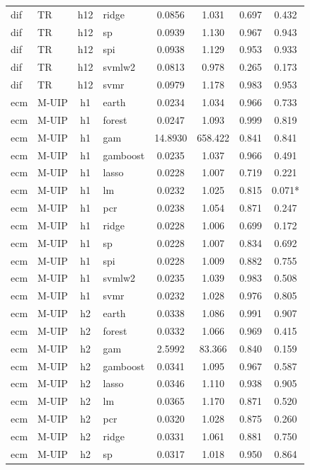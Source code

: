 \begin{ThreePartTable}
\begin{longtable}[t]{llclcccc}
dif & TR & h12 & ridge & 0.0856 & 1.031 & 0.697 & 0.432\\
dif & TR & h12 & sp & 0.0939 & 1.130 & 0.967 & 0.943\\
dif & TR & h12 & spi & 0.0938 & 1.129 & 0.953 & 0.933\\
dif & TR & h12 & svmlw2 & 0.0813 & 0.978 & 0.265 & 0.173\\
dif & TR & h12 & svmr & 0.0979 & 1.178 & 0.983 & 0.953\\
\addlinespace
ecm & M-UIP & h1 & earth & 0.0234 & 1.034 & 0.966 & 0.733\\
ecm & M-UIP & h1 & forest & 0.0247 & 1.093 & 0.999 & 0.819\\
ecm & M-UIP & h1 & gam & 14.8930 & 658.422 & 0.841 & 0.841\\
ecm & M-UIP & h1 & gamboost & 0.0235 & 1.037 & 0.966 & 0.491\\
ecm & M-UIP & h1 & lasso & 0.0228 & 1.007 & 0.719 & 0.221\\
ecm & M-UIP & h1 & lm & 0.0232 & 1.025 & 0.815 & 0.071*\\
ecm & M-UIP & h1 & pcr & 0.0238 & 1.054 & 0.871 & 0.247\\
ecm & M-UIP & h1 & ridge & 0.0228 & 1.006 & 0.699 & 0.172\\
ecm & M-UIP & h1 & sp & 0.0228 & 1.007 & 0.834 & 0.692\\
ecm & M-UIP & h1 & spi & 0.0228 & 1.009 & 0.882 & 0.755\\
ecm & M-UIP & h1 & svmlw2 & 0.0235 & 1.039 & 0.983 & 0.508\\
ecm & M-UIP & h1 & svmr & 0.0232 & 1.028 & 0.976 & 0.805\\
\addlinespace
ecm & M-UIP & h2 & earth & 0.0338 & 1.086 & 0.991 & 0.907\\
ecm & M-UIP & h2 & forest & 0.0332 & 1.066 & 0.969 & 0.415\\
ecm & M-UIP & h2 & gam & 2.5992 & 83.366 & 0.840 & 0.159\\
ecm & M-UIP & h2 & gamboost & 0.0341 & 1.095 & 0.967 & 0.587\\
ecm & M-UIP & h2 & lasso & 0.0346 & 1.110 & 0.938 & 0.905\\
ecm & M-UIP & h2 & lm & 0.0365 & 1.170 & 0.871 & 0.520\\
ecm & M-UIP & h2 & pcr & 0.0320 & 1.028 & 0.875 & 0.260\\
ecm & M-UIP & h2 & ridge & 0.0331 & 1.061 & 0.881 & 0.750\\
ecm & M-UIP & h2 & sp & 0.0317 & 1.018 & 0.950 & 0.864\\

\end{longtable}
\end{ThreePartTable}

